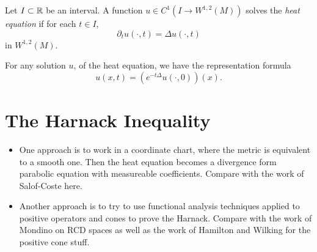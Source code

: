 \documentclass{amsart}
\begin{document}
\begin{defn}
Let \(I \subset \mathbb{R}\) be an interval. A function \(u \in C^1(I \to W^{1,2}(M))\) solves the \emph{heat equation} if for each \(t \in I\),
\[
\partial_t u (\cdot, t) = \Delta u (\cdot, t)
\]
in \(W^{1,2}(M)\).
\end{defn}

\begin{rem}
For any solution \(u\), of the heat equation, we have the representation formula
\[
u(x, t) = \left(e^{-t \Delta} u(\cdot, 0)\right) (x).
\]
\end{rem}

\section{The Harnack Inequality}
\label{sec:harnack}

\begin{itemize}
\item One approach is to work in a coordinate chart, where the metric is equivalent to a smooth one. Then the heat equation becomes a divergence form parabolic equation with measureable coefficients. Compare with the work of Salof-Coste here.
\item Another approach is to try to use functional analysis techniques applied to positive operators and cones to prove the Harnack. Compare with the work of Mondino on RCD spaces as well as the work of Hamilton and Wilking for the positive cone stuff.
\end{itemize}
\end{document}
